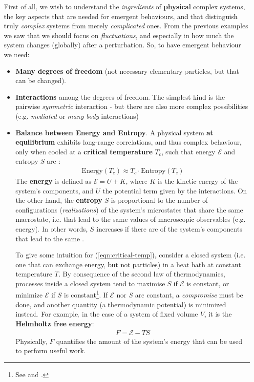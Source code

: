 \documentclass[../template.tex]{subfiles}
\begin{document}
First of all, we wish to understand the \textit{ingredients} of \textbf{physical }complex systems, the key aspects that are needed for emergent behaviours, and that distinguish truly \textit{complex} systems from merely \textit{complicated} ones. From the previous examples we saw that we should focus on \textit{fluctuations}, and especially in how much the system changes (globally) after a perturbation. So, to have emergent behaviour we need:
\begin{itemize}
    \item \textbf{Many degrees of freedom} (not necessary elementary particles, but  that can be changed).
    \item \textbf{Interactions} among the degrees of freedom. The simplest kind is the pairwise \textit{symmetric} interaction - but there are also more complex possibilities (e.g. \textit{mediated} or \textit{many-body} interactions)
    \item \textbf{Balance between Energy and Entropy}. A physical system \textbf{at equilibrium} exhibits long-range correlations, and thus complex behaviour, only when cooled at a \textbf{critical temperature} $T_c$, such that energy $\mathcal{E}$ and entropy $S$ are :
    \begin{align} \label{eqn:critical-temp}
        \text{Energy}(T_c) \approx T_c \cdot \text{Entropy}(T_c)    
    \end{align}
    The \textbf{energy} is defined as $\mathcal{E} = U + K$, where $K$ is the kinetic energy of the system's components, and $U$ the potential term given by the interactions. On the other hand, the \textbf{entropy} $S$ is proportional to the number of configurations (\textit{realizations}) of the system's microstates that share the same macrostate, i.e. that lead to the same values of macroscopic observables (e.g. energy). In other words, $S$ increases if there are  of the system's components that lead to the same . 

    \medskip

    To give some intuition for (\ref{eqn:critical-temp}), consider a closed system (i.e. one that can exchange energy, but not particles) in a heat bath at constant temperature $T$. By consequence of the second law of thermodynamics, processes inside a closed system tend to maximise $S$ if $\mathcal{E}$ is constant, or minimize $\mathcal{E}$ if $S$ is constant\footnote{See  and .}. If $\mathcal{E}$ nor $S$ are constant, a \textit{compromise} must be done, and another quantity (a thermodynamic potential) is minimized instead. For example, in the case of a system of fixed volume $V$, it is the \textbf{Helmholtz free energy}:
    \begin{align} \label{eqn:free-energy}
        F = \mathcal{E} - TS
    \end{align}
    Physically, $F$ quantifies the amount of the system's energy that can be used to perform useful work. 


\end{itemize}
\end{document}
